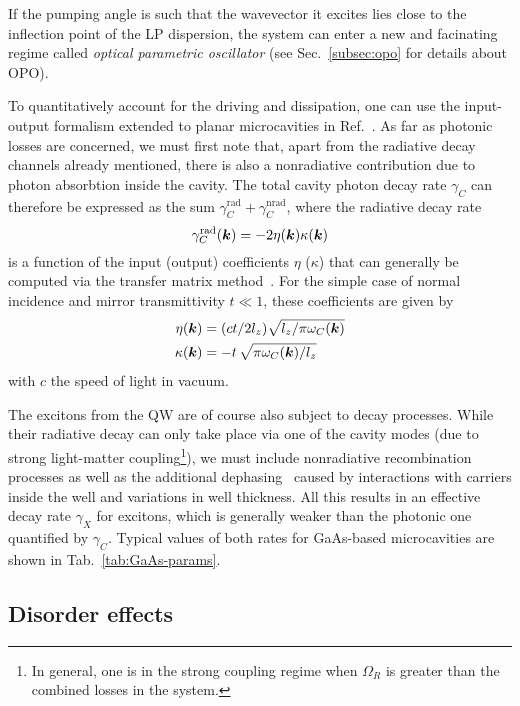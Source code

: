  If the pumping angle is such that the wavevector it excites
lies close to the inflection point of the LP dispersion, the system
can enter a new and facinating regime called \textit{optical
  parametric oscillator} (see Sec.~\ref{subsec:opo} for details about
OPO).

To quantitatively account for the driving and dissipation, one can use
the input-output formalism extended to planar microcavities in
Ref.~\cite{Ciuti2006}. As far as photonic losses are concerned, we
must first note that, apart from the radiative decay channels already
mentioned, there is also a nonradiative contribution due to photon
absorbtion inside the cavity. The total cavity photon decay rate
$\gamma_C$ can therefore be expressed as the sum
$\gamma_C^{\text{rad}} + \gamma_C^{\text{nrad}}$, where the radiative
decay rate
%
\begin{equation}\label{eq:rad-decay}
  \gamma_C^{\text{rad}}(\bm{k}) = -2 \eta(\bm{k})\kappa(\bm{k})
\end{equation}
% 
is a function of the input (output) coefficients $\eta$ ($\kappa$)
that can generally be computed via the transfer matrix
method~\cite{burstein2012confined}. For the simple case of normal
incidence and mirror transmittivity $t \ll 1$, these coefficients are
given by~\cite{Carusotto_2013}
\begin{align}
  \begin{split}
    \eta(\bm{k}) & =(c t/2l_z) \sqrt{l_z/\pi\omega_C(\bm{k})}\\
    \kappa(\bm{k}) & =-t\,\sqrt{\pi \omega_C(\bm{k}) / l_z}  
  \end{split}
\end{align}
with $c$ the speed of light in vacuum.

The excitons from the QW are of course also subject to decay
processes. While their radiative decay can only take place via one of
the cavity modes (due to strong light-matter coupling\footnote{In
  general, one is in the strong coupling regime when $\Omega_R$ is
  greater than the combined losses in the system.}), we must include
nonradiative recombination processes as well as the additional
dephasing~\cite{Liew2011} caused by interactions with carriers inside
the well and variations in well thickness. All this results in an
effective decay rate $\gamma_X$ for excitons, which is generally
weaker than the photonic one quantified by $\gamma_C$. Typical values
of both rates for GaAs-based microcavities are shown in
Tab.~\ref{tab:GaAs-params}.


\subsection{Disorder effects}
\label{subsec:disorder}


